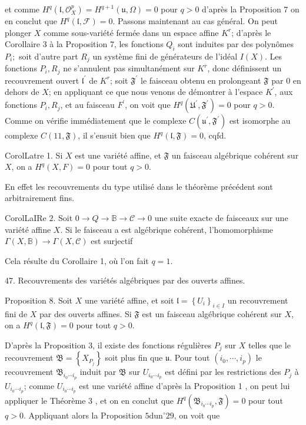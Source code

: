 et comme $H^{q}\left(\mathfrak{l}, \mathcal{O}_{X}^{p}\right)=H^{q+1}(\mathfrak{u}, \Omega)=0$ pour $q>0$ d'après la Proposition 7 on en conclut que $H^{q}(\mathfrak{l}, \mathcal{F})=0$. Passons maintenant au cas général. On peut plonger $X$ comme sous-variété fermée dans un espace affine $K^{r}$; d'après le Corollaire 3 à la Proposition 7, les fonctions $Q_{i}$ sont induites par des polynômes $P_{i} ;$ soit d'autre part $R_{j}$ un système fini de générateurs de l'idéal $I(X)$. Les fonctions $P_{i}, R_{j}$ ne s'annulent pas simultanément sur $K^{r}$, donc définissent un recouvrement ouvert $\mathfrak{l}^{\prime}$ de $K^{r}$; soit $\mathfrak{F}^{\prime}$ le faisceau obtenu en prolongeant $\mathfrak{F}$ par 0 en dehors de $X$; en appliquant ce que nous venons de démontrer à l'espace $K^{\prime}$, aux fonctions $P_{i}, R_{j}$, et au faisceau $F^{\prime}$, on voit que $H^{q}\left(\mathfrak{U}^{\prime}, \mathfrak{F}^{\prime}\right)=0$ pour $q>0 .$ Comme on vérifie immédiatement que le complexe $C\left(\mathfrak{u}^{\prime}, \mathfrak{F}^{\prime}\right)$ est isomorphe au complexe $C(11, \mathfrak{F})$, il s'ensuit bien que $H^{q}(\mathfrak{l}, \mathfrak{F})=0$, cqfd.

CorolLatre 1. Si $X$ est une variété affine, et $\mathfrak{F}$ un faisceau algébrique cohérent sur $X$, on a $H^{q}(X, F)=0$ pour tout $q>0$.

En effet les recouvrements du type utilisé dans le théorème précédent sont arbitrairement fins.

CorolLaIRe $2 .$ Soit $0 \rightarrow Q \rightarrow \mathbb{B} \rightarrow \mathcal{C} \rightarrow 0$ une suite exacte de faisceaux sur une variété affine $X .$ Si le faisceau a est algébrique cohérent, l'homomorphisme $\Gamma(X, \mathbb{B}) \rightarrow \Gamma(X, \mathcal{C})$ est surjectif

Cela résulte du Corollaire 1, où l'on fait $q=1$.

47. Recouvrements des variétés algébriques par des ouverts affines.

Proposition 8. Soit $X$ une variété affine, et soit $\mathfrak{l}=\left\{U_{i}\right\}_{i \in I}$ un recouvrement fini de $X$ par des ouverts affines. Si $\mathfrak{F}$ est un faisceau algébrique cohérent sur $X$, on a $H^{q}(\mathfrak{l}, \mathfrak{F})=0$ pour tout $q>0$.

D'après la Proposition 3, il existe des fonctions régulières $P_{j}$ sur $X$ telles que le recouvrement $\mathfrak{B}=\left\{X_{P_{j}}\right\}$ soit plus fin que $\mathfrak{u}$. Pour tout $\left(i_{0}, \cdots, i_{p}\right)$ le recouvrement $\mathfrak{B}_{i_{0} \cdots i_{p}}$ induit par $\mathfrak{B}$ sur $U_{i_{0} \cdots i_{p}}$ est défini par les restrictions des $P_{j}$ à $U_{i_{0} \cdots i_{p}}$; comme $U_{i_{0} \cdots i_{p}}$ est une variété affine d'après la Proposition 1 , on peut lui appliquer le Théorème 3 , et on en conclut que $H^{q}\left(\mathfrak{B}_{i_{0} \cdots i_{p}}, \mathfrak{F}\right)=0$ pour tout $q>0 .$ Appliquant alors la Proposition $5 \mathrm{du} \mathrm{n}^{\circ} 29$, on voit que

